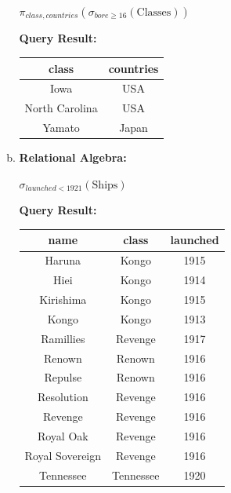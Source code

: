 \documentclass[12pt]{article}
\begin{document}
\begin{enumerate}
\begin{enumerate}[a)]
        $\pi_{class,countries}(\sigma_{bore \geq 16}(\text{Classes}))$

        \bigskip

        \textbf{Query Result:}

        \bigskip

        \begin{tabular}{|c|c|}
            \hline
            class   &   countries\\
            \hline
            Iowa    &   USA   \\
            \hline
            North Carolina  &   USA\\
            \hline
            Yamato  &   Japan\\
            \hline
        \end{tabular}

        \item

        \textbf{Relational Algebra:}

        \bigskip

        $\sigma_{launched < 1921}(\text{Ships})$

        \bigskip

        \textbf{Query Result:}

        \bigskip

        \begin{tabular}{|c|c|c|}
            \hline
            name    &   class   & launched\\
            \hline
            Haruna  &   Kongo   & 1915\\
            \hline
            Hiei    &   Kongo   & 1914\\
            \hline
            Kirishima   & Kongo & 1915\\
            \hline
            Kongo       & Kongo & 1913\\
            \hline
            Ramillies   & Revenge & 1917\\
            \hline
            Renown      & Renown & 1916\\
            \hline
            Repulse     & Renown & 1916\\
            \hline
            Resolution  & Revenge & 1916\\
            \hline
            Revenge     & Revenge & 1916\\
            \hline
            Royal Oak   & Revenge & 1916\\
            \hline
            Royal Sovereign & Revenge & 1916\\
            \hline
            Tennessee   & Tennessee & 1920\\
            \hline
        \end{tabular}


\end{enumerate}
\end{enumerate}
\end{document}

